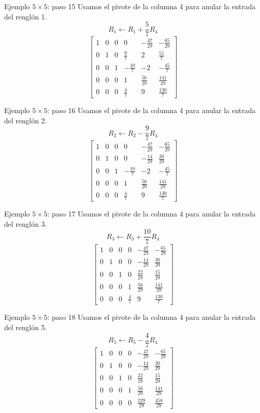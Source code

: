 \documentclass[aspectratio=169,9pt]{beamer}
\theoremstyle{remark}
\begin{document}
\begin{frame}[t]{Ejemplo $5\times5$: paso 15}
Usamos el pivote de la columna 4 para anular la entrada del renglón 1.
\[
R_{1}\leftarrow R_{1}+\frac{5}{7}R_{4}
\]
\[
\left[\begin{array}{ccccc|c}
1 & 0 & 0 & 0 & - \frac{47}{29} & - \frac{65}{29}\\
0 & 1 & 0 & \frac{9}{7} & 2 & \frac{51}{7}\\
0 & 0 & 1 & - \frac{10}{7} & -2 & - \frac{45}{7}\\
0 & 0 & 0 & 1 & \frac{56}{29} & \frac{141}{29}\\
0 & 0 & 0 & \frac{4}{7} & 9 & \frac{130}{7}
\end{array}\right]
\]
\end{frame}
\begin{frame}[t]{Ejemplo $5\times5$: paso 16}
Usamos el pivote de la columna 4 para anular la entrada del renglón 2.
\[
R_{2}\leftarrow R_{2}-\frac{9}{7}R_{4}
\]
\[
\left[\begin{array}{ccccc|c}
1 & 0 & 0 & 0 & - \frac{47}{29} & - \frac{65}{29}\\
0 & 1 & 0 & 0 & - \frac{14}{29} & \frac{30}{29}\\
0 & 0 & 1 & - \frac{10}{7} & -2 & - \frac{45}{7}\\
0 & 0 & 0 & 1 & \frac{56}{29} & \frac{141}{29}\\
0 & 0 & 0 & \frac{4}{7} & 9 & \frac{130}{7}
\end{array}\right]
\]
\end{frame}
\begin{frame}[t]{Ejemplo $5\times5$: paso 17}
Usamos el pivote de la columna 4 para anular la entrada del renglón 3.
\[
R_{3}\leftarrow R_{3}+\frac{10}{7}R_{4}
\]
\[
\left[\begin{array}{ccccc|c}
1 & 0 & 0 & 0 & - \frac{47}{29} & - \frac{65}{29}\\
0 & 1 & 0 & 0 & - \frac{14}{29} & \frac{30}{29}\\
0 & 0 & 1 & 0 & \frac{22}{29} & \frac{15}{29}\\
0 & 0 & 0 & 1 & \frac{56}{29} & \frac{141}{29}\\
0 & 0 & 0 & \frac{4}{7} & 9 & \frac{130}{7}
\end{array}\right]
\]
\end{frame}
\begin{frame}[t]{Ejemplo $5\times5$: paso 18}
Usamos el pivote de la columna 4 para anular la entrada del renglón 5.
\[
R_{5}\leftarrow R_{5}-\frac{4}{7}R_{4}
\]
\[
\left[\begin{array}{ccccc|c}
1 & 0 & 0 & 0 & - \frac{47}{29} & - \frac{65}{29}\\
0 & 1 & 0 & 0 & - \frac{14}{29} & \frac{30}{29}\\
0 & 0 & 1 & 0 & \frac{22}{29} & \frac{15}{29}\\
0 & 0 & 0 & 1 & \frac{56}{29} & \frac{141}{29}\\
0 & 0 & 0 & 0 & \frac{229}{29} & \frac{458}{29}
\end{array}\right]
\]
\end{frame}
\end{document}
